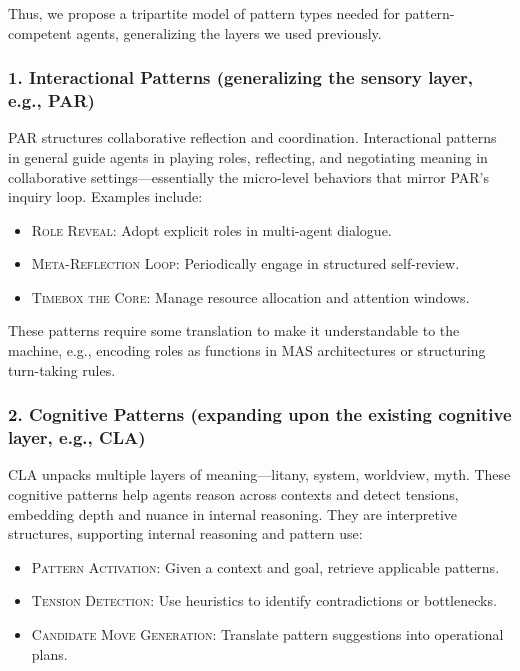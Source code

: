 \documentclass[acmlarge,timestamp]{acmart}
\providecommand{\tightlist}{%
  \setlength{\itemsep}{0pt}\setlength{\parskip}{0pt}}
\begin{document}
Thus, we propose a tripartite model of pattern types needed for
pattern-competent agents, generalizing the layers we used previously.

\subsubsection*{1. Interactional Patterns (generalizing the sensory layer, e.g., PAR)}

{PAR structures collaborative reflection and coordination. Interactional
patterns in general guide agents in playing roles, reflecting, and
negotiating meaning in collaborative settings---essentially the
micro-level behaviors that mirror PAR's inquiry loop. }{Examples
include:}

\begin{itemize}
\tightlist
\item[]
  {\scshape{Role Reveal}}{: Adopt explicit roles in multi-agent dialogue.}
\item[]
  {\scshape{Meta-Reflection Loop}}{: Periodically engage in structured
  self-review.}
\item[]
  {\scshape{Timebox the Core}}{: Manage resource allocation and attention
  windows.}
\end{itemize}

These patterns require some translation to make it understandable to
the machine, e.g., encoding roles as functions in MAS architectures or
structuring turn-taking rules.

\subsubsection*{2. Cognitive Patterns (expanding upon the existing cognitive layer,
e.g., CLA)}

CLA unpacks multiple layers of meaning---litany, system, worldview,
myth. These cognitive patterns help agents reason across contexts and
detect tensions, embedding depth and nuance in internal
reasoning. They are interpretive structures, supporting internal
reasoning and pattern use:

\begin{itemize}
\tightlist
\item[]
  {\scshape{Pattern Activation}}{: Given a context and goal, retrieve applicable
  patterns.}
\item[]
  {\scshape{Tension Detection}}{: Use heuristics to identify contradictions or
  bottlenecks.}
\item[]
  {\scshape{Candidate Move Generation}}{: Translate pattern suggestions into
  operational plans.}
\end{itemize}
\end{document}
